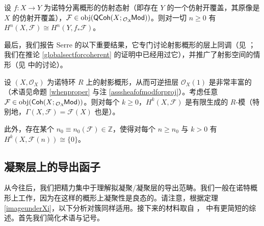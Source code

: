\begin{Cor}\label{sheafcohomthroughCechRem}
设 $f:X\rightarrow Y$ 为诺特分离概形的仿射态射（即存在 $Y$ 的一个仿射开覆盖，其原像是 $X$ 的仿射开覆盖），$\mathcal{F}\in\textup{obj}(\mathsf{QCoh}(X;{}_{\mathcal{O}_X}\!\mathsf{Mod}))$。则对一切 $n\geq 0$ 有 $H^n(X,\mathcal{F})\cong H^n(Y,f_*\mathcal{F})$。
\end{Cor}

最后，我们报告 Serre 的以下重要结果，它专门讨论射影概形的层上同调（见 \cite[Theorem III.5.2]{[Har77]}；我们在推论 \ref{globalsectforcoherent} 的证明中已经用过它），并推广了射影空间的情形（见 \cite[Theorem III.5.1]{[Har77]} 中的讨论）。

\begin{Thm}\label{sheafcohomforprojsch}
设 $(X,\mathcal{O}_X)$ 为诺特环 $R$ 上的射影概形，从而可逆扭层 $\mathcal{O}_X(1)$ 是非常丰富的（术语见命题 \ref{whenproper} 与注 \ref{asssheafofmodforproj}）。考虑任意 $\mathcal{F}\in\textup{obj}(\mathsf{Coh}(X;{}_{\mathcal{O}_X}\!\mathsf{Mod}))$。则对每个 $k\geq 0$，$H^k(X,\mathcal{F})$ 是有限生成的 $R$-模（特别地，$\Gamma(X,\mathcal{F})=\mathcal{F}(X)$ 也是）。

此外，存在某个 $n_0\equiv n_0(\mathcal{F})\in\mathbb{Z}$，使得对每个 $n\geq n_0$ 与 $k>0$ 有 $H^k(X,\mathcal{F}(n))\cong\{0\}$。
\end{Thm}

\subsection{凝聚层上的导出函子}\label{ch6.3}

从今往后，我们把精力集中于理解拟凝聚/凝聚层的导出范畴。我们一般在诺特概形上工作，因为在这样的概形上凝聚性是良态的。请注意，根据定理 \ref{imageunderXi}，以下分析对簇同样适用。接下来的材料取自 \cite[chapter 3]{[Huy06]}，\cite[chapter 3]{[Hoc19]} 中有更简短的综述。首先我们简化术语与记号。

